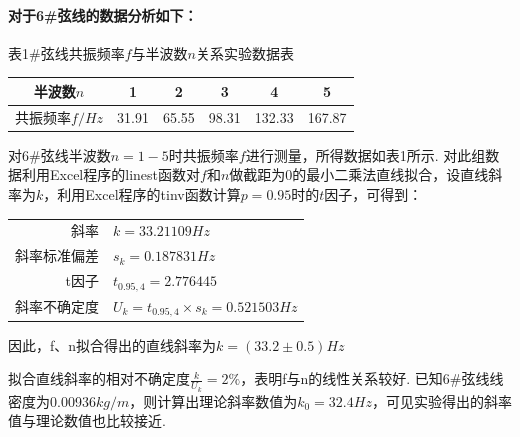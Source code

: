 \documentclass[UTF8]{ctexart}
\begin{document}
\paragraph{对于6\#弦线的数据分析如下：}
\begin{center}
{\kaishu 表1\#弦线共振频率$f$与半波数$n$关系实验数据表}
\begin{tabular}{|c|c|c|c|c|c|}
\hline
	{半波数\tiny\quad\normalsize$n$}&1&2&3&4&5\\
\hline
	{共振频率$f/Hz$}&{31.91}&{65.55}&{98.31}&{132.33}&{167.87}\\
\hline
\end{tabular}
\end{center}
\par 对6\#弦线半波数$n = 1 - 5$时共振频率$f$进行测量，所得数据如表1所示. 对此组数据利用Excel程序的linest函数对$f$和$n$做截距为0的最小二乘法直线拟合，设直线斜率为$k$，利用Excel程序的tinv函数计算$p = 0.95$时的$t$因子，可得到：\par
\begin{center}\begin{tabular}{r l}
{斜率}& {$k=33.21109Hz$}\\
{斜率标准偏差}& {$s_k=0.187831Hz$}\\
{t因子}& {$t_{0.95,4}=2.776445$}\\
{斜率不确定度}& {$U_k=t_{0.95,4}\times s_k = 0.521503Hz$}
\end{tabular}\end{center}
因此，f、n拟合得出的直线斜率为$k=(33.2\pm0.5)Hz$\par
\begin{figure}[H]\centering{}
\end{figure}
拟合直线斜率的相对不确定度$\frac{k}{U_k} = 2\%$，表明f与n的线性关系较好. 已知6\#弦线线密度为0.00936$kg/m$，则计算出理论斜率数值为$k_0=32.4Hz$，可见实验得出的斜率值与理论数值也比较接近.
\end{document}
